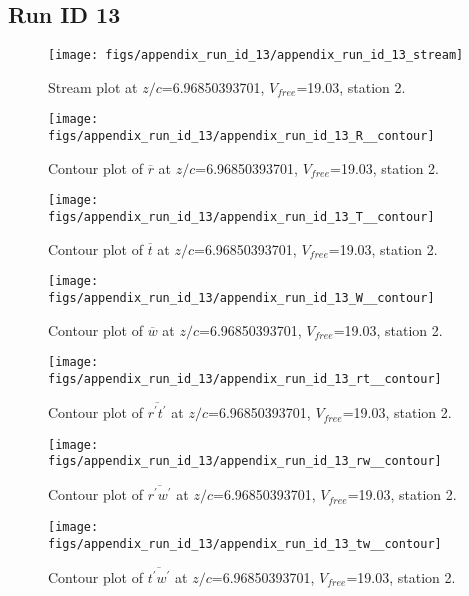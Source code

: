 \subsection{Run ID 13}
\begin{figure}[H]
\centering
\texttt{[image: figs/appendix\_run\_id\_13/appendix\_run\_id\_13\_stream]}
\caption{Stream plot at $z/c$=6.96850393701, $V_{free}$=19.03, station 2.}
\label{fig:appendix_run_id_13_stream}
\end{figure}


\begin{figure}[H]
\centering
\texttt{[image: figs/appendix\_run\_id\_13/appendix\_run\_id\_13\_R\_\_contour]}
\caption{Contour plot of $\overline{r}$ at $z/c$=6.96850393701, $V_{free}$=19.03, station 2.}
\label{fig:appendix_run_id_13_R__contour}
\end{figure}


\begin{figure}[H]
\centering
\texttt{[image: figs/appendix\_run\_id\_13/appendix\_run\_id\_13\_T\_\_contour]}
\caption{Contour plot of $\overline{t}$ at $z/c$=6.96850393701, $V_{free}$=19.03, station 2.}
\label{fig:appendix_run_id_13_T__contour}
\end{figure}


\begin{figure}[H]
\centering
\texttt{[image: figs/appendix\_run\_id\_13/appendix\_run\_id\_13\_W\_\_contour]}
\caption{Contour plot of $\overline{w}$ at $z/c$=6.96850393701, $V_{free}$=19.03, station 2.}
\label{fig:appendix_run_id_13_W__contour}
\end{figure}


\begin{figure}[H]
\centering
\texttt{[image: figs/appendix\_run\_id\_13/appendix\_run\_id\_13\_rt\_\_contour]}
\caption{Contour plot of $\overline{r^\prime t^\prime}$ at $z/c$=6.96850393701, $V_{free}$=19.03, station 2.}
\label{fig:appendix_run_id_13_rt__contour}
\end{figure}


\begin{figure}[H]
\centering
\texttt{[image: figs/appendix\_run\_id\_13/appendix\_run\_id\_13\_rw\_\_contour]}
\caption{Contour plot of $\overline{r^\prime w^\prime}$ at $z/c$=6.96850393701, $V_{free}$=19.03, station 2.}
\label{fig:appendix_run_id_13_rw__contour}
\end{figure}


\begin{figure}[H]
\centering
\texttt{[image: figs/appendix\_run\_id\_13/appendix\_run\_id\_13\_tw\_\_contour]}
\caption{Contour plot of $\overline{t^\prime w^\prime}$ at $z/c$=6.96850393701, $V_{free}$=19.03, station 2.}
\label{fig:appendix_run_id_13_tw__contour}
\end{figure}



